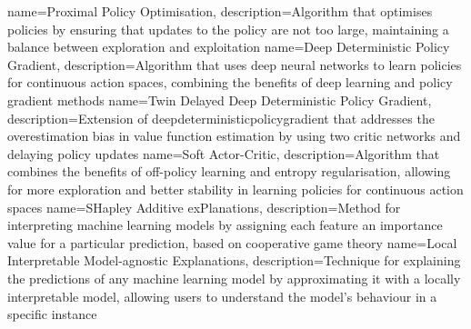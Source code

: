 {
    name=Proximal Policy Optimisation,
    description={Algorithm that optimises policies by ensuring that updates to the policy are not too large, maintaining a balance between exploration and exploitation}
}
{
    name=Deep Deterministic Policy Gradient,
    description={Algorithm that uses deep neural networks to learn policies for continuous action spaces, combining the benefits of deep learning and policy gradient methods}
}
{
    name=Twin Delayed Deep Deterministic Policy Gradient,
    description={Extension of \Gls{deepdeterministicpolicygradient} that addresses the overestimation bias in value function estimation by using two critic networks and delaying policy updates}
}
{
    name=Soft Actor-Critic,
    description={Algorithm that combines the benefits of off-policy learning and entropy regularisation, allowing for more exploration and better stability in learning policies for continuous action spaces}
}
{
    name=SHapley Additive exPlanations,
    description={Method for interpreting machine learning models by assigning each feature an importance value for a particular prediction, based on cooperative game theory}
}
{
    name=Local Interpretable Model-agnostic Explanations,
    description={Technique for explaining the predictions of any machine learning model by approximating it with a locally interpretable model, allowing users to understand the model's behaviour in a specific instance}
}
